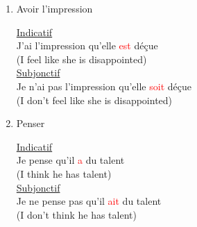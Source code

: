 \documentclass{book}
\begin{document}
\begin{itemize}
\begin{itemize}
\begin{enumerate}
                    \item Avoir l'impression
                    \begin{center}
                        \underline{Indicatif} \\
                        J'ai l'impression qu'elle \textcolor{red}{est} déçue \\
                        (I feel like she is disappointed) \\
                        \underline{Subjonctif} \\
                        Je n'ai pas l'impression qu'elle \textcolor{red}{soit} déçue \\
                        (I don't feel like she is disappointed)
                    \end{center}

                    \item Penser
                    \begin{center}
                        \underline{Indicatif} \\
                        Je pense qu'il \textcolor{red}{a} du talent \\
                        (I think he has talent) \\
                        \underline{Subjonctif} \\
                        Je ne pense pas qu'il \textcolor{red}{ait} du talent \\
                        (I don't think he has talent)
                    \end{center}
                \end{enumerate}
                
            \end{itemize}
            

\end{itemize}
\end{document}

